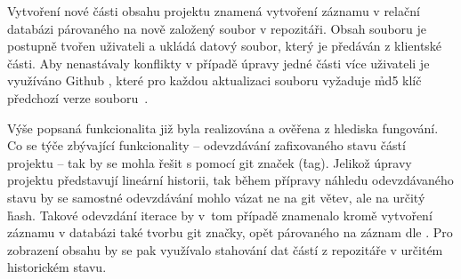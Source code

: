 Vytvoření nové části obsahu projektu znamená vytvoření záznamu v relační databázi párovaného na nově založený soubor v repozitáři.
Obsah souboru je postupně tvořen uživateli a ukládá datový  soubor, který je předáván z klientské části.
Aby nenastávaly konflikty v případě úpravy jedné části více uživateli je využíváno Github , které pro každou aktualizaci souboru vyžaduje \h{md5} klíč předchozí verze souboru~\cite{githubupdate}.

Výše popsaná funkcionalita již byla realizována a ověřena z hlediska fungování.
Co se týče zbývající funkcionality – odevzdávání zafixovaného stavu částí projektu – tak by se mohla řešit s pomocí git značek (\h{tag}).
Jelikož úpravy projektu představují lineární historii, tak během přípravy náhledu odevzdávaného stavu by se samostné odevzdávání mohlo vázat ne na git větev, ale na určitý \h{hash}.
Takové odevzdání iterace by v~tom případě znamenalo kromě vytvoření záznamu v databázi také tvorbu git značky, opět párovaného na záznam dle .
Pro zobrazení obsahu by se pak využívalo stahování dat částí z repozitáře v určitém historickém stavu.
